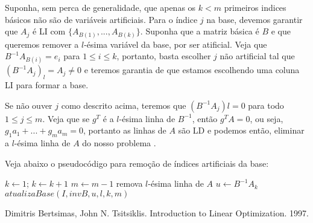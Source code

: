 \documentclass[12pt]{article}
\begin{document}
Suponha, sem perca de generalidade, que apenas os $k < m$ primeiros indices básicos não são de variáveis artificiais. Para o índice $j$ na base, devemos garantir que $A_{j}$ é LI com $\{A_{B(1)}, ..., A_{B(k)}\}$. Suponha que a matriz básica é $B$ e que queremos remover a $l$-ésima variável da base, por ser atificial. Veja que $B^{-1}A_{B(i)} = e_i$ para $1 \leq i \leq k$, portanto, basta escolher $j$ não artificial tal que $(B^{-1}A_j)_l = A_j  \neq 0$ e teremos garantia de que estamos escolhendo uma coluna LI para formar a base.

Se não ouver $j$ como descrito acima, teremos que $(B^{-1}A_j)l = 0$ para todo $1 \leq j \leq m$. Veja que se $g^T$ é a $l$-ésima linha de $B^{-1}$, então $g^TA = 0$, ou seja, $g_1a_1 + ... + g_ma_m = 0$, portanto as linhas de $A$ são LD e podemos então, eliminar a $l$-ésima linha de $A$ do nosso problema \cite{315book}.

Veja abaixo o pseudocódigo para remoção de índices artificiais da base:
\bigskip

\begin{algorithmic}
		\State $k \gets 1$;
			\State $k \gets k + 1$
		\EndWhile
			\State $m \gets m - 1$
			\State remova $l$-ésima linha de $A$
		\Else
			\State $u \gets B^{-1}A_k$ 
			\State $atualizaBase(I, invB, u, l, k, m)$
		\EndIf 
	\EndFor
\EndFunction
\end{algorithmic}
	

	

\newpage
\begin{thebibliography}{9}
 Dimitris Bertsimas, John N. Tsitsiklis. Introduction to Linear Optimization. 1997.
\end{thebibliography}
\end{document}
